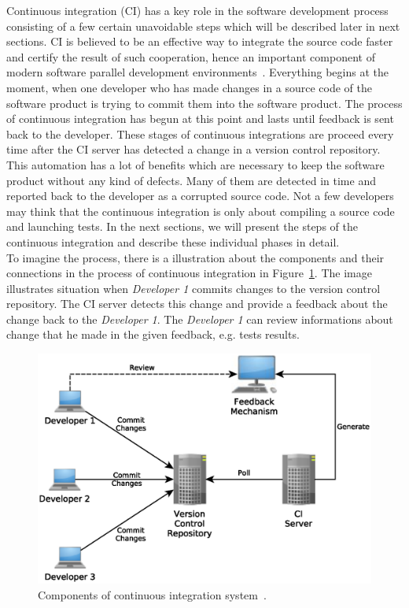 Continuous integration (CI) has a key role in the software development process consisting of a few certain unavoidable steps which will be described later in next sections. CI is believed to be an effective way to integrate the source code faster and certify the result of such cooperation, hence an important component of modern software parallel development environments~\cite{ResultsOfCIbuild}. Everything begins at the moment, when one developer who has made changes in a source code of the software product is trying to commit them into the software product. The process of continuous integration has begun at this point and lasts until feedback is sent back to the developer. These stages of continuous integrations are proceed every time after the CI server has detected a change in a version control repository. This automation has a lot of benefits which are necessary to keep the software product without any kind of defects. Many of them are detected in time and reported back to the developer as a corrupted source code. Not a few developers may think that the continuous integration is only about compiling a source code and launching tests. In the next sections, we will present the steps of the continuous integration and describe these individual phases in detail.\\

To imagine the process, there is a illustration about the components and their connections in the process of continuous integration in Figure~\ref{fig:cocis}. The image illustrates situation when \textit{Developer 1} commits changes to the version control repository. The CI server detects this change and provide a feedback about the change back to the \textit{Developer 1}. The \textit{Developer 1} can review informations about change that he made in the given feedback, e.g. tests results.

\begin{figure}[H]
    \centering
    \includegraphics[scale=0.6]{yEd/components_of_CI_system.eps}
    \caption{Components of continuous integration system~\cite{CIbook}.}
    \label{fig:cocis}
\end{figure}

